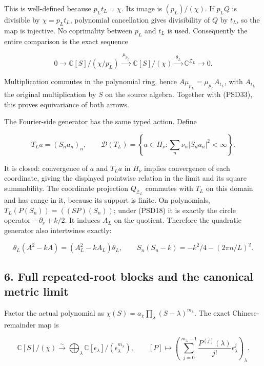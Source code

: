 This is well-defined because \(p_L t_L=\chi\). Its image is \((p_L)/(\chi)\). If \(p_LQ\) is divisible by \(\chi=p_Lt_L\), polynomial cancellation gives divisibility of \(Q\) by \(t_L\), so the map is injective. No coprimality between \(p_L\) and \(t_L\) is used. Consequently the entire comparison is the exact sequence

\[
0\longrightarrow\mathbb C[S]/(\chi/p_L)
\xrightarrow{\;\mu_{p_L}\;}\mathbb C[S]/(\chi)
\xrightarrow{\;\theta_L\;}\mathbb C^{\mathcal Z_L}
\longrightarrow0.
\tag{PSD33b}
\]

Multiplication commutes in the polynomial ring, hence \(A\mu_{p_L}=\mu_{p_L}A_{t_L}\), with \(A_{t_L}\) the original multiplication by \(S\) on the source algebra. Together with (PSD33), this proves equivariance of both arrows.

The Fourier-side generator has the same typed action. Define

\[
T_La=(S_na_n)_n,\qquad
\mathcal D(T_L)=\left\{a\in H_\nu:\sum_n\nu_n|S_na_n|^2<\infty\right\}.
\tag{PSD33c}
\]

It is closed: convergence of \(a\) and \(T_La\) in \(H_\nu\) implies convergence of each coordinate, giving the displayed pointwise relation in the limit and its square summability. The coordinate projection \(Q_{\mathcal Z_L}\) commutes with \(T_L\) on this domain and has range in it, because its support is finite. On polynomials, \(T_L(P(S_n))=((SP)(S_n))\); under (PSD18) it is exactly the circle operator \(-\partial_r+k/2\). It induces \(A_L\) on the quotient. Therefore the quadratic generator also intertwines exactly:

\[
\theta_L(A^2-kA)=(A_L^2-kA_L)\theta_L,
\qquad S_n(S_n-k)=-k^2/4-(2\pi n/L)^2.
\tag{PSD33d}
\]

\subsection{6. Full repeated-root blocks and the canonical metric limit}\label{full-repeated-root-blocks-and-the-canonical-metric-limit}

Factor the actual polynomial as \(\chi(S)=a_\chi\prod_\lambda(S-\lambda)^{m_\lambda}\). The exact Chinese-remainder map is

\[
\mathbb C[S]/(\chi)\xrightarrow{\sim}
\bigoplus_\lambda\mathbb C[\epsilon_\lambda]/(\epsilon_\lambda^{m_\lambda}),
\qquad
[P]\longmapsto
\left(\sum_{j=0}^{m_\lambda-1}\frac{P^{(j)}(\lambda)}{j!}\epsilon_\lambda^j\right)_\lambda.
\tag{PSD34}
\]

